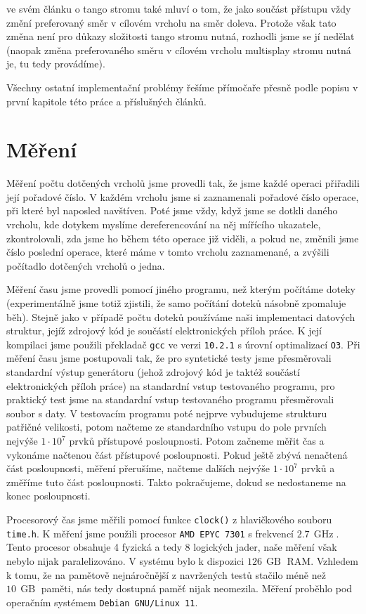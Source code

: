 \citet{tango} ve svém článku o tango stromu také mluví o tom, že jako součást přístupu vždy změní preferovaný směr v cílovém vrcholu na směr doleva. Protože však tato změna není pro důkazy složitosti tango stromu nutná, rozhodli jsme se jí nedělat (naopak změna preferovaného směru v cílovém vrcholu multisplay stromu nutná je, tu tedy provádíme).

Všechny ostatní implementační problémy řešíme přímočaře přesně podle popisu v první kapitole této práce a příslušných článků.

\section{Měření}

Měření počtu dotčených vrcholů jsme provedli tak, že jsme každé operaci 
přiřadili její pořadové číslo. V každém vrcholu jsme si zaznamenali pořadové číslo
operace, při které byl naposled navštíven. Poté jsme vždy, když jsme se dotkli daného
vrcholu, kde dotykem myslíme dereferencování na něj mířícího ukazatele,
zkontrolovali, zda jsme ho během této operace již viděli, a pokud ne, změnili jsme
číslo poslední operace, které máme v tomto vrcholu zaznamenané, a zvýšili
počítadlo dotčených vrcholů o jedna.

Měření času jsme provedli pomocí jiného programu, než kterým počítáme doteky
(experimentálně jsme totiž zjistili, že samo počítání doteků násobně zpomaluje
běh). Stejně jako v případě počtu doteků používáme naši implementaci datových
struktur, jejíž zdrojový kód je součástí elektronických příloh práce. K její
kompilaci jsme použili překladač {\tt gcc} ve verzi {\tt 10.2.1} s úrovní
optimalizací {\tt O3}. Při měření času jsme postupovali tak, že pro syntetické
testy jsme přesměrovali standardní výstup generátoru (jehož zdrojový kód je
taktéž součástí elektronických příloh práce) na standardní vstup testovaného
programu, pro praktický test jsme na standardní vstup testovaného programu
přesměrovali soubor s daty. V testovacím programu poté nejprve vybudujeme
strukturu patřičné velikosti, potom načteme ze standardního vstupu do pole
prvních nejvýše $1\cdot10^7$ prvků přístupové posloupnosti. Potom začneme měřit
čas a vykonáme načtenou část přístupové posloupnosti. Pokud ještě zbývá
nenačtená část posloupnosti, měření přerušíme, načteme dalších nejvýše
$1\cdot10^7$ prvků a změříme tuto část posloupnosti. Takto pokračujeme, dokud
se nedostaneme na konec posloupnosti.

Procesorový čas jsme měřili pomocí funkce {\tt clock()} z hlavičkového souboru
{\tt time.h}. K měření jsme použili procesor {\tt AMD EPYC 7301} s
frekvencí  $2.7\, \operatorname{GHz}$. Tento procesor obsahuje 4 fyzická a tedy
8 logických jader, naše měření však nebylo nijak paralelizováno. V systému bylo
k dispozici $126\,\operatorname{GB}$ RAM. Vzhledem k tomu, že na pamětově
nejnáročnější z navržených testů stačilo méně než $10\,\operatorname{GB}$
paměti, nás tedy dostupná paměť nijak neomezila. Měření proběhlo pod operačním
systémem {\tt Debian GNU/Linux 11}.

